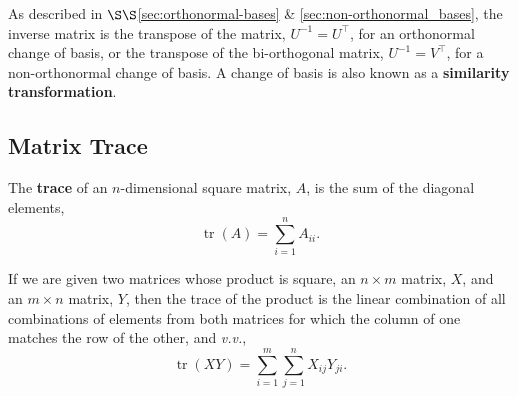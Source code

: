 \documentclass[12pt, twoside, draft]{article}
\begin{document}
As described in $\S\S$\ref{sec:orthonormal-bases} \& \ref{sec:non-orthonormal_bases}, the inverse matrix is the transpose of the matrix, $U^{-1} = U^\top$, for an orthonormal change of basis, or the transpose of the bi-orthogonal matrix, $U^{-1} = V^\top$, for a non-orthonormal change of basis.  A change of basis is also known as a \textbf{similarity transformation}.
 
\subsection{Matrix Trace}\label{sec:matrix_trace}
The \textbf{trace} of an $n$-dimensional square matrix, $A$, is the sum of the diagonal elements,
\begin{equation}\label{eq:trace_definition}
\operatorname{tr}(A) = \sum_{i=1}^n A_{ii}.
\end{equation}

If we are given two matrices whose product is square, an $n \times m$ matrix, $X$, and an $m \times n$ matrix, $Y$, then the trace of the product is the linear combination of all combinations of elements from both matrices for which the column of one matches the row of the other, and \textit{v.v.},
\begin{equation}\label{eq:trace_product_definition}
\operatorname{tr}(XY) = \sum_{i=1}^m \sum_{j=1}^n X_{ij} Y_{ji}.
\end{equation}
\end{document}
